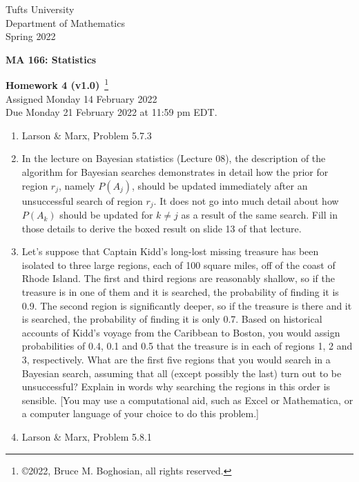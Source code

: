 \documentclass [12pt] {article}
\begin{document}
\thispagestyle{empty}
\begin{center}
Tufts University\\
Department of Mathematics\\
Spring 2022 \\
\end{center}
\begin{center}
{\bf MA 166: Statistics}\\
\end{center}
\begin{center}
{\bf\Large Homework 4 {\small (v1.0)}}~\footnote{\copyright 2022, Bruce M. Boghosian, all rights reserved.}\\
Assigned Monday 14 February 2022\\
Due Monday 21 February 2022 at 11:59 pm EDT.
\end{center}

\begin{enumerate}

\item Larson \& Marx, Problem 5.7.3

\item In the lecture on Bayesian statistics (Lecture 08), the description of the algorithm for Bayesian searches demonstrates in detail how the prior for region $r_j$, namely $P(A_j)$, should be updated immediately after an unsuccessful search of region $r_j$.  It does not go into much detail about how $P(A_k)$ should be updated for $k\neq j$ as a result of the same search.  Fill in those details to derive the boxed result on slide 13 of that lecture.

\item Let's suppose that Captain Kidd's long-lost missing treasure has been isolated to three large regions, each of 100 square miles, off of the coast of Rhode Island.  The first and third regions are reasonably shallow, so if the treasure is in one of them and it is searched, the probability of finding it is 0.9.  The second region is significantly deeper, so if the treasure is there and it is searched, the probability of finding it is only 0.7.  Based on historical accounts of Kidd's voyage from the Caribbean to Boston, you would assign probabilities of 0.4, 0.1 and 0.5 that the treasure is in each of regions 1, 2 and 3, respectively.  What are the first five regions that you would search in a Bayesian search, assuming that all (except possibly the last) turn out to be unsuccessful?  Explain in words why searching the regions in this order is sensible.  [You may use a computational aid, such as Excel or Mathematica, or a computer language of your choice to do this problem.]

\item Larson \& Marx, Problem 5.8.1

\end{enumerate}
\end{document}
